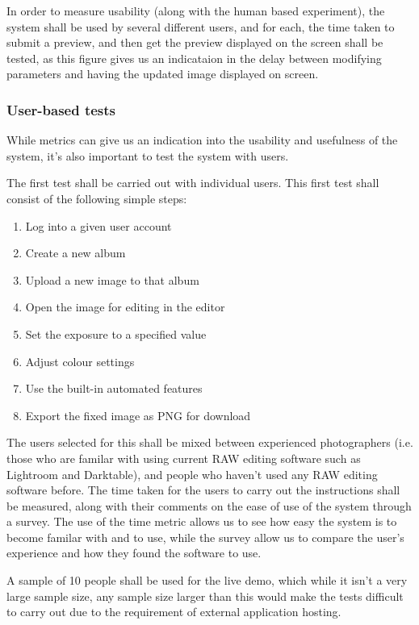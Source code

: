 \documentclass[12pt,a4paper]{article}
\begin{document}
In order to measure usability (along with the human based experiment), the system shall be used by
several different users, and for each, the time taken to submit a preview, and then get the preview displayed
on the screen shall be tested, as this figure gives us an indicataion in the delay between modifying parameters
and having the updated image displayed on screen.

\subsubsection{User-based tests}
While metrics can give us an indication into the usability and usefulness of the system,
it's also important to test the system with users.

The first test shall be carried out with individual users. This first test shall consist of
the following simple steps:

\begin{enumerate}
  \item Log into a given user account
  \item Create a new album
  \item Upload a new image to that album
  \item Open the image for editing in the editor
  \item Set the exposure to a specified value
  \item Adjust colour settings
  \item Use the built-in automated features
  \item Export the fixed image as PNG for download
\end{enumerate}

The users selected for this shall be mixed between experienced photographers (i.e. those
who are familar with using current RAW editing software such as Lightroom and Darktable), and
people who haven't used any RAW editing software before. The time taken for the users to carry
out the instructions shall be measured, along with their comments on the ease of use of the system through a survey.
The use of the time metric allows us to see how easy the system is to become familar with and to use, while the survey
allow us to compare the user's experience and how they found the software to use.

A sample of 10 people shall be used for the live demo, which while it isn't a very large sample size,
any sample size larger than this would make the tests difficult to carry out due to the requirement of external
application hosting.
\end{document}

